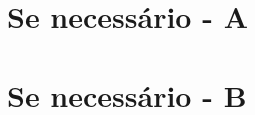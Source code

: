 \begin{apendicesenv}

\chapter{Se necessário - A}



\chapter{Se necessário - B}


\end{apendicesenv}
